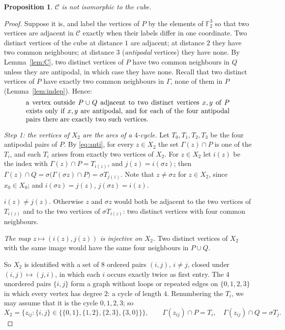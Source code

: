 \documentclass[11pt,a4paper]{article}
\newtheorem{proposition}[theorem]{Proposition}
\theoremstyle{remark}
\newcommand{\FF}{\mathbb{F}}
\newcommand{\sg}{\sigma}
\newcommand{\Nb}{\Gamma}
\begin{document}
\begin{proposition}\label{prop:cube}
$\mathcal C$ is not isomorphic to the cube.
\end{proposition}
\begin{proof}
Suppose it is, and label the vertices of $P$ by the elements of $\FF_2^3$ so that two vertices are adjacent in
$\mathcal C$ exactly when their labels differ in one coordinate. Two distinct vertices of the cube at distance $1$
are adjacent; at distance $2$ they have two common neighbours; at distance $3$ (\emph{antipodal} vertices) they have
none. By Lemma~\ref{lem:C}, two distinct vertices of $P$ have two common neighbours in $Q$ unless they are antipodal,
in which case they have none. Recall that two distinct vertices of $P$ have exactly two common neighbours in
$\Gamma$, none of them in $P$ (Lemma~\ref{lem:indep}). Hence:
\begin{equation}\label{eq:anti}
\begin{minipage}{0.86\textwidth}
a vertex outside $P\cup Q$ adjacent to two distinct vertices $x,y$ of $P$ exists only if $x,y$ are antipodal, and
for each of the four antipodal pairs there are exactly two such vertices.
\end{minipage}
\end{equation}

\medskip\noindent\emph{Step 1: the vertices of $X_2$ are the arcs of a $4$-cycle.}
Let $T_0,T_1,T_2,T_3$ be the four antipodal pairs of $P$. By \eqref{eq:anti}, for every $z\in X_2$ the set
$\Nb(z)\cap P$ is one of the $T_i$, and each $T_i$ arises from exactly two vertices of $X_2$. For $z\in X_2$ let
$i(z)$ be the index with $\Nb(z)\cap P=T_{i(z)}$, and $j(z)=i(\sg z)$; then
$\Nb(z)\cap Q=\sg\bigl(\Nb(\sg z)\cap P\bigr)=\sg T_{j(z)}$. Note that $z\ne\sg z$ for $z\in X_2$, since
$x_0\in X_0$; and $i(\sg z)=j(z)$, $j(\sg z)=i(z)$.

\emph{$i(z)\ne j(z)$.} Otherwise $z$ and $\sg z$ would both be adjacent to the two vertices of $T_{i(z)}$ and to the
two vertices of $\sg T_{i(z)}$: two distinct vertices with four common neighbours.

\emph{The map $z\mapsto(i(z),j(z))$ is injective on $X_2$.} Two distinct vertices of $X_2$ with the same image
would have the same four neighbours in $P\cup Q$.

So $X_2$ is identified with a set of $8$ ordered pairs $(i,j)$, $i\ne j$, closed under $(i,j)\mapsto(j,i)$, in
which each $i$ occurs exactly twice as first entry. The $4$ unordered pairs $\{i,j\}$ form a graph without loops
or repeated edges on $\{0,1,2,3\}$ in which every vertex has degree $2$: a cycle of length $4$. Renumbering the
$T_i$, we may assume that it is the cycle $0,1,2,3$; so
\[
X_2=\{z_{ij}:\{i,j\}\in\{\{0,1\},\{1,2\},\{2,3\},\{3,0\}\}\},\qquad
\Nb(z_{ij})\cap P=T_i,\quad\Nb(z_{ij})\cap Q=\sg T_j .
\]


\end{proof}
\end{document}
